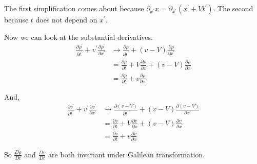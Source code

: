 The first simplification comes about because $\partial_{x^\prime} x = \partial_{x^\prime} \left( x^\prime + Vt^\prime\right)$.
The second because $t$ does not depend on $x^\prime$.


Now we can look at the substantial derivatives.
\begin{align*}
\frac{\partial \rho^\prime}{\partial t^\prime} + v^\prime \frac{\partial \rho^\prime}{\partial x^\prime}
    &\rightarrow \frac{\partial \rho}{\partial t^\prime} + (v-V) \frac{\partial \rho}{\partial x^\prime} \\
&= \frac{\partial \rho}{\partial t} + V \frac{\partial \rho}{\partial x}
    + (v-V) \frac{\partial \rho}{\partial x} \\
&= \frac{\partial \rho}{\partial t} + v \frac{\partial \rho}{\partial x}
\end{align*}



And,
\begin{align*}
\frac{\partial v^\prime}{\partial t^\prime} + v^\prime \frac{\partial v^\prime}{\partial x^\prime}
    &\rightarrow \frac{\partial (v-V)}{\partial t^\prime} + (v-V) \frac{\partial (v-V)}{\partial x^\prime} \\
&= \frac{\partial v}{\partial t} + V \frac{\partial v}{\partial x} +
    (v-V) \frac{\partial v}{\partial x} \\
&= \frac{\partial v}{\partial t} + v \frac{\partial v}{\partial x}
\end{align*}

So $\frac{D\rho}{Dt}$ and $\frac{Dv}{Dt}$ are both invariant under Galilean transformation.
\\~\\